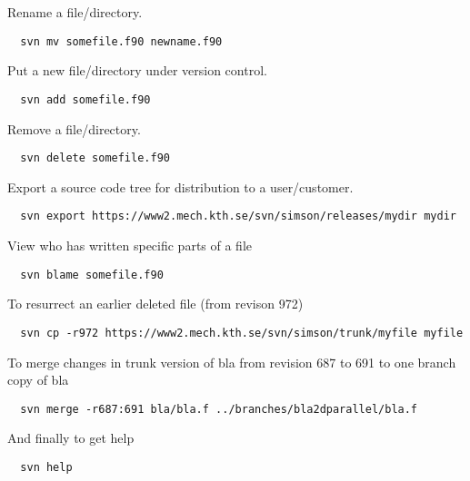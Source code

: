 \documentclass[10pt,a4paper]{simson}
\begin{document}
Rename a file/directory.
\begin{verbatim}
  svn mv somefile.f90 newname.f90
\end{verbatim}
Put a new file/directory under version control.
\begin{verbatim}
  svn add somefile.f90
\end{verbatim}
Remove a file/directory.
\begin{verbatim}
  svn delete somefile.f90
\end{verbatim}
Export a source code tree for distribution to a user/customer.
\begin{verbatim}
  svn export https://www2.mech.kth.se/svn/simson/releases/mydir mydir
\end{verbatim}
View who has written specific parts of a file
\begin{verbatim}
  svn blame somefile.f90
\end{verbatim}
To resurrect an earlier deleted file (from revison 972)
\begin{verbatim}
  svn cp -r972 https://www2.mech.kth.se/svn/simson/trunk/myfile myfile
\end{verbatim}
To merge changes in trunk version of bla from revision 687 to 691 to
one branch copy of bla
\begin{verbatim}
  svn merge -r687:691 bla/bla.f ../branches/bla2dparallel/bla.f
\end{verbatim}
And finally to get help
\begin{verbatim}
  svn help
\end{verbatim}

\newpage



\end{document}
